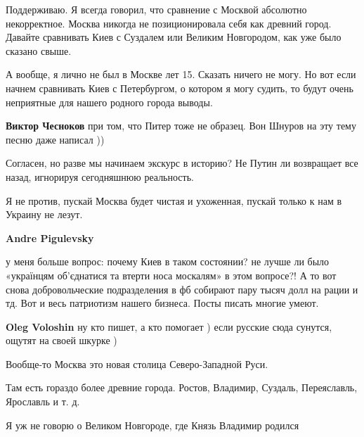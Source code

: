 \begin{itemize} %

Поддерживаю. Я всегда говорил, что сравнение с Москвой абсолютно некорректное.
Москва никогда не позиционировала себя как древний город. Давайте сравнивать
Киев с Суздалем или Великим Новгородом, как уже было сказано свыше.

А вообще, я лично не был в Москве лет 15. Сказать ничего не могу. Но вот если
начнем сравнивать Киев с Петербургом, о котором я могу судить, то будут очень
неприятные для нашего родного города выводы.

\textbf{Виктор Чесноков} при том, что Питер тоже не образец. Вон Шнуров на эту тему песню даже написал ))


Согласен, но разве мы начинаем экскурс в историю? Не Путин ли возвращает все
назад, игнорируя сегодняшнюю реальность.

Я не против, пускай Москва будет чистая и ухоженная, пускай только к нам в
Украину не лезут.

\begin{itemize} %
\textbf{Andre Pigulevsky} 

у меня больше вопрос: почему Киев в таком состоянии? не лучше ли было
«українцям об’єднатися та втерти носа москалям» в этом вопросе?! А то вот снова
добровольческие подразделения в фб собирают пару тысяч долл на рации и тд. Вот
и весь патриотизм нашего бизнеса. Посты писать многие умеют.

\textbf{Oleg Voloshin} ну кто пишет, а кто помогает ) если русские сюда сунутся, ощутят на своей шкурке )
\end{itemize} %


Вообще-то Москва это новая столица Северо-Западной Руси.

Там есть гораздо более древние города. Ростов, Владимир, Суздаль, Переяславль,
Ярославль и т. д.

Я уж не говорю о Великом Новгороде, где Князь Владимир родился

\end{itemize} %
